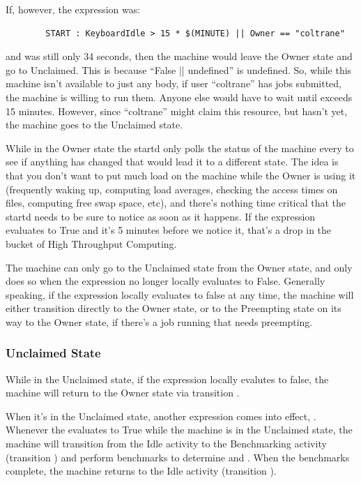 If, however, the  expression was:
\begin{verbatim}
        START : KeyboardIdle > 15 * $(MINUTE) || Owner == "coltrane"
\end{verbatim}
and  was still only 34 seconds, then the machine
would leave the Owner state and go to Unclaimed.  This is because
``False || undefined'' is undefined.  So, while this machine isn't
available to just any body, if user ``coltrane'' has jobs submitted,
the machine is willing to run them.  Anyone else would have to wait
until  exceeds 15 minutes.  However, since
``coltrane'' might claim this resource, but hasn't yet, the machine
goes to the Unclaimed state.

While in the Owner state the startd only polls the status of the
machine every  to see if anything has changed
that would lead it to a different state.  The idea is that you don't
want to put much load on the machine while the Owner is using it
(frequently waking up, computing load averages, checking the access
times on files, computing free swap space, etc), and there's nothing
time critical that the startd needs to be sure to notice as soon as it
happens.  If the  expression evaluates to True and it's 5
minutes before we notice it, that's a drop in the bucket of High
Throughput Computing.

The machine can only go to the Unclaimed state from the Owner state,
and only does so when the  expression no longer locally
evaluates to False.  Generally speaking, if the 
expression locally evaluates to false at any time, the machine will
either transition directly to the Owner state, or to the Preempting
state on its way to the Owner state, if there's a job running that
needs preempting.

\subsubsection{Unclaimed State}
\label{sec:Unclaimed-State}

While in the Unclaimed state, if the  expression locally
evalutes to false, the machine will return to the Owner state via
transition .

When it's in the Unclaimed state, another expression comes into
effect,  \label{param:RunBenchmarks}.  
Whenever the  evaluates to True while the machine
is in the Unclaimed state, the machine will transition from the Idle
activity to the Benchmarking activity (transition ) and
perform benchmarks to determine  and .  
When the benchmarks complete, the machine returns to the Idle activity
(transition ).

